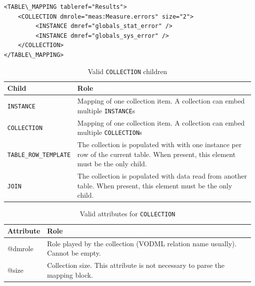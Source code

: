 \documentclass[11pt,a4paper]{ivoa}
\begin{document}
\begin{lstlisting}[caption={\texttt{COLLECTION} example},style=XML]
<TABLE\_MAPPING tableref="Results">
    <COLLECTION dmrole="meas:Measure.errors" size="2">
         <INSTANCE dmref="globals_stat_error" />         
         <INSTANCE dmref="globals_sys_error" />
    </COLLECTION>
</TABLE\_MAPPING>
\end{lstlisting}

\begin{table}[!h]
\small
\centering
\begin{tabulary}{\linewidth}{|L|J|}
       \hline 
           \textbf{Child} &
           \textbf{Role}\\
       \hline  \hline
           \texttt{INSTANCE}    & 
           Mapping of one collection item. A collection can embed multiple \texttt{INSTANCE}s \\              
       \hline  
           \texttt{COLLECTION}    & 
           Mapping of one collection item. A collection can embed multiple \texttt{COLLECTION}s \\              
       \hline  
           \texttt{TABLE\_ROW\_TEMPLATE}    & 
          The collection is populated with with one instance per row of the current table. When present, this element must be the only child. \\       
       \hline  
          \texttt{JOIN}    & 
         The collection is populated with data read from another table. When present, this element must be the only child.\\      
       \hline 
\end{tabulary}
\caption{Valid  \texttt{COLLECTION} children} 
\label{tbl:coll-children}
\end{table}

\begin{table}[!h]
\small
\centering
\begin{tabulary}{\linewidth}{|L|J|}
       \hline 
           \textbf{Attribute} & 
           \textbf{Role}\\
       \hline  \hline
          @dmrole    & 
           Role played by the collection (VODML relation name usually). Cannot be empty.\\       
       \hline  
          @size    & 
          Collection size. This attribute is not necessary to parse the mapping block.\\       
       \hline 
 \end{tabulary}
 \caption{Valid attributes for  \texttt{COLLECTION}} 
 \label{tbl:att-att}
 \end{table}
\end{document}
